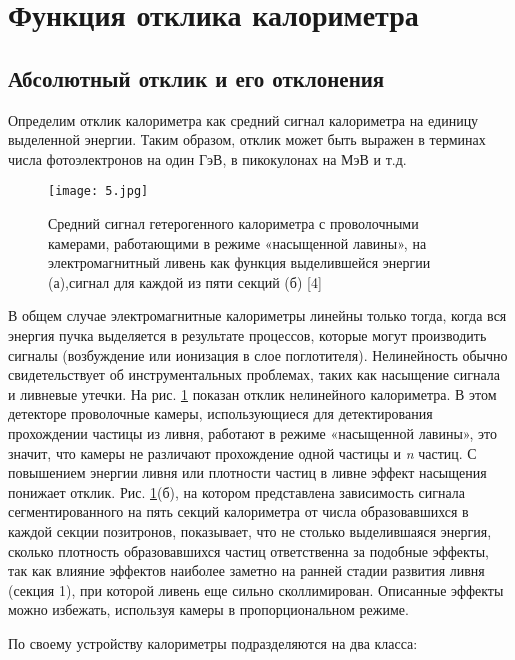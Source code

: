 \newpage
\section{Функция отклика калориметра}  \label{chap2} 
\subsection{Абсолютный отклик и его отклонения} \label{chap2.1}

Определим  отклик  калориметра  как  средний  сигнал  калориметра  на единицу выделенной энергии. Таким образом, отклик может быть выражен в терминах числа фотоэлектронов на один ГэВ, в пикокулонах на МэВ и т.д. 

\begin{figure}[!h]
    \centering
    \texttt{[image: 5.jpg]}
    \caption{Средний сигнал гетерогенного калориметра с проволочными камерами, работающими в режиме «насыщенной лавины», на электромагнитный ливень как функция выделившейся энергии (а),сигнал для каждой из пяти секций (б) [4]}
    \label{fig:meanSign}
\end{figure}

В общем случае электромагнитные калориметры линейны только тогда, когда вся энергия пучка выделяется в результате процессов, которые могут производить  сигналы  (возбуждение  или  ионизация  в  слое  поглотителя). Нелинейность обычно свидетельствует об инструментальных проблемах, таких как  насыщение  сигнала и  ливневые  утечки.  На  рис. \ref{fig:meanSign} показан  отклик нелинейного  калориметра.  В  этом  детекторе  проволочные  камеры, использующиеся  для детектирования прохождении  частицы  из  ливня, работают  в  режиме  «насыщенной  лавины»,  это  значит,  что  камеры  не различают прохождение одной частицы и \textit{n} частиц. С повышением энергии ливня или плотности  частиц в ливне  эффект насыщения понижает отклик. Рис. \ref{fig:meanSign}(б), на котором представлена зависимость сигнала сегментированного на пять  секций  калориметра  от  числа  образовавшихся  в  каждой  секции позитронов, показывает,  что  не  столько  выделившаяся  энергия,  сколько плотность  образовавшихся  частиц  ответственна  за  подобные  эффекты,  так как  влияние  эффектов  наиболее  заметно  на  ранней  стадии  развития  ливня (секция  1),  при  которой ливень  еще  сильно  сколлимирован. Описанные эффекты можно избежать, используя камеры в пропорциональном режиме.

По своему устройству калориметры подразделяются на два класса:

